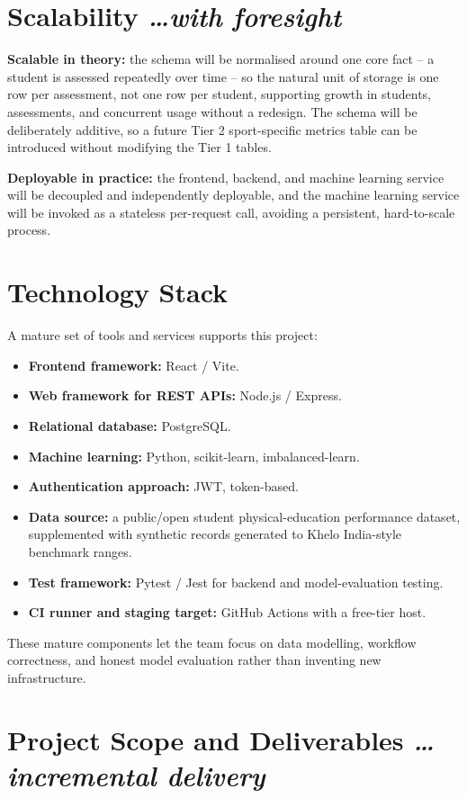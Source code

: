 \documentclass[11pt,a4paper]{article}
\newcommand{\BvrHint}[1]{%
  {\normalfont\normalsize\itshape\hfill #1}}
\begin{document}
\section{Scalability %
\BvrHint{\ldots with foresight}}
\textbf{Scalable in theory:} the schema will be normalised
around one core fact -- a student is assessed repeatedly
over time -- so the natural unit of storage is one row per
assessment, not one row per student, supporting growth in
students, assessments, and concurrent usage without a
redesign. The schema will be deliberately additive, so a
future Tier 2 sport-specific metrics table can be
introduced without modifying the Tier 1 tables.

\textbf{Deployable in practice:} the frontend, backend, and
machine learning service will be decoupled and
independently deployable, and the machine learning service
will be invoked as a stateless per-request call, avoiding a
persistent, hard-to-scale process.

\section{Technology Stack}
A mature set of tools and services supports this project:
\begin{itemize}[leftmargin=0.7cm]
    \item \textbf{Frontend framework:} React / Vite.
    \item \textbf{Web framework for REST APIs:} Node.js / Express.
    \item \textbf{Relational database:} PostgreSQL.
    \item \textbf{Machine learning:} Python, scikit-learn, imbalanced-learn.
    \item \textbf{Authentication approach:} JWT, token-based.
    \item \textbf{Data source:} a public/open student physical-education performance dataset, supplemented with synthetic records generated to Khelo India-style benchmark ranges.
    \item \textbf{Test framework:} Pytest / Jest for backend and model-evaluation testing.
    \item \textbf{CI runner and staging target:} GitHub Actions with a free-tier host.
\end{itemize}
These mature components let the team focus on data
modelling, workflow correctness, and honest model
evaluation rather than inventing new infrastructure.

\section{Project Scope and Deliverables %
\BvrHint{\ldots incremental delivery}}
\end{document}
